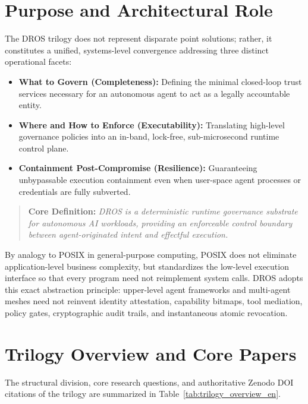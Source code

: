 \documentclass[conference]{IEEEtran}
\begin{document}
\section{Purpose and Architectural Role}
The DROS trilogy does not represent disparate point solutions; rather, it constitutes a unified, systems-level convergence addressing three distinct operational facets:
\begin{itemize}
    \item \textbf{What to Govern (Completeness):} Defining the minimal closed-loop trust services necessary for an autonomous agent to act as a legally accountable entity.
    \item \textbf{Where and How to Enforce (Executability):} Translating high-level governance policies into an in-band, lock-free, sub-microsecond runtime control plane.
    \item \textbf{Containment Post-Compromise (Resilience):} Guaranteeing unbypassable execution containment even when user-space agent processes or credentials are fully subverted.
\end{itemize}

\begin{quote}
\textbf{Core Definition:} \textit{DROS is a deterministic runtime governance substrate for autonomous AI workloads, providing an enforceable control boundary between agent-originated intent and effectful execution.}
\end{quote}

By analogy to POSIX in general-purpose computing, POSIX does not eliminate application-level business complexity, but standardizes the low-level execution interface so that every program need not reimplement system calls. DROS adopts this exact abstraction principle: upper-level agent frameworks and multi-agent meshes need not reinvent identity attestation, capability bitmaps, tool mediation, policy gates, cryptographic audit trails, and instantaneous atomic revocation.

\section{Trilogy Overview and Core Papers}
The structural division, core research questions, and authoritative Zenodo DOI citations of the trilogy are summarized in Table~\ref{tab:trilogy_overview_en}.
\end{document}
